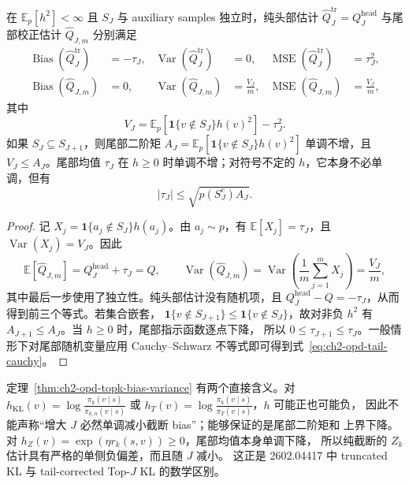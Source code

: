 \begin{theorem}
\label{thm:ch2-opd-topk-bias-variance}
在 $\mathbb E_p[h^2]<\infty$ 且 $S_J$ 与 auxiliary samples 独立时，纯头部估计
$\widehat Q_J^{\mathrm{tr}}=Q_J^{\mathrm{head}}$ 与尾部校正估计
$\widehat Q_{J,m}$ 分别满足
\begin{align}
\operatorname{Bias}(\widehat Q_J^{\mathrm{tr}})&=-\tau_J,&
\operatorname{Var}(\widehat Q_J^{\mathrm{tr}})&=0,&
\operatorname{MSE}(\widehat Q_J^{\mathrm{tr}})&=\tau_J^2,\\
\operatorname{Bias}(\widehat Q_{J,m})&=0,&
\operatorname{Var}(\widehat Q_{J,m})&=\frac{V_J}{m},&
\operatorname{MSE}(\widehat Q_{J,m})&=\frac{V_J}{m},
\end{align}
其中
\begin{equation}
V_J=\mathbb E_p\left[\mathbf 1\{v\notin S_J\}h(v)^2\right]-\tau_J^2.
\label{eq:ch2-opd-tail-variance}
\end{equation}
如果 $S_J\subseteq S_{J+1}$，则尾部二阶矩
$A_J=\mathbb E_p[\mathbf 1\{v\notin S_J\}h(v)^2]$ 单调不增，且
$V_J\le A_J$。尾部均值 $\tau_J$ 在 $h\ge0$ 时单调不增；对符号不定的
$h$，它本身不必单调，但有
\begin{equation}
|\tau_J|\le \sqrt{p(S_J^c)A_J}.
\label{eq:ch2-opd-tail-cauchy}
\end{equation}
\end{theorem}

\begin{proof}
记 $X_j=\mathbf 1\{a_j\notin S_J\}h(a_j)$。由 $a_j\sim p$，有
$\mathbb E[X_j]=\tau_J$，且 $\operatorname{Var}(X_j)=V_J$。因此
\begin{equation}
\mathbb E[\widehat Q_{J,m}]
 =Q_J^{\mathrm{head}}+\tau_J=Q,
\qquad
\operatorname{Var}(\widehat Q_{J,m})
 =\operatorname{Var}\left(\frac1m\sum_{j=1}^mX_j\right)
 =\frac{V_J}{m},
\end{equation}
其中最后一步使用了独立性。纯头部估计没有随机项，且
$Q_J^{\mathrm{head}}-Q=-\tau_J$，从而得到前三个等式。若集合嵌套，
$\mathbf 1\{v\notin S_{J+1}\}\le\mathbf 1\{v\notin S_J\}$，故对非负
$h^2$ 有 $A_{J+1}\le A_J$。当 $h\ge0$ 时，尾部指示函数逐点下降，
所以 $0\le\tau_{J+1}\le\tau_J$。一般情形下对尾部随机变量应用
Cauchy--Schwarz 不等式即可得到式~\eqref{eq:ch2-opd-tail-cauchy}。
\end{proof}

定理~\ref{thm:ch2-opd-topk-bias-variance} 有两个直接含义。对
$h_{\mathrm{KL}}(v)=\log\frac{\pi_k(v\mid s)}{\pi_{k,n}(v\mid s)}$
或 $h_T(v)=\log\frac{\pi_k(v\mid s)}{\pi_T(v\mid s)}$，$h$ 可能正也可能负，
因此不能声称“增大 $J$ 必然单调减小截断 bias”；能够保证的是尾部二阶矩和
上界下降。对 $h_Z(v)=\exp(\eta r_k(s,v))\ge0$，尾部均值本身单调下降，
所以纯截断的 $Z_k$ 估计具有严格的单侧负偏差，而且随 $J$ 减小。
这正是 2602.04417 中 truncated KL 与 tail-corrected Top-$J$ KL 的数学区别。

